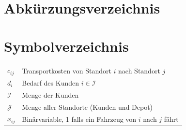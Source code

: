 \documentclass[11pt,a4paper]{article}
\begin{document}
\section*{Abkürzungsverzeichnis}
\begin{acronym}[VRP]
\end{acronym}

\newpage
{}
\section*{Symbolverzeichnis}
\begin{tabular}{p{} p{}}
	$c_{ij}$ & Transportkosten von Standort $i$ nach Standort $j$\\
	$d_i$ & Bedarf des Kunden $i \in \mathcal{I}$\\
	$\mathcal{I}$ & Menge der Kunden\\
	$\mathcal{J}$ & Menge aller Standorte (Kunden und Depot)\\
	$x_{ij}$ & Binärvariable, 1 falls ein Fahrzeug von $i$ nach $j$ fährt
\end{tabular}

\newpage
{}
\end{document}
